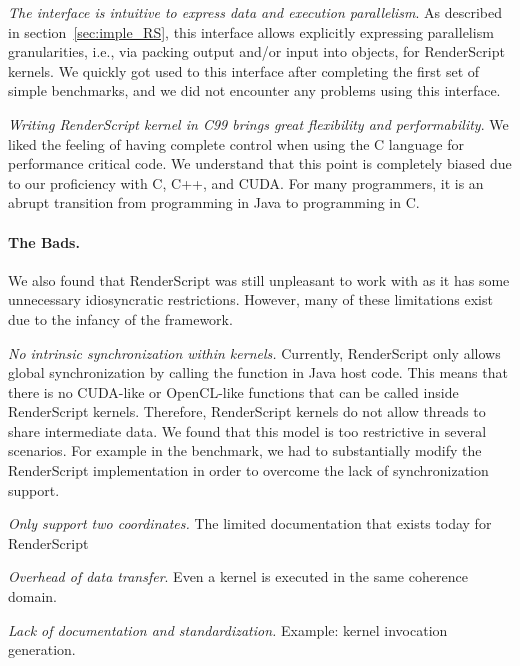\textit{The  interface is intuitive to express data and
execution parallelism}. As described in section~\ref{sec:imple_RS}, this
 interface allows explicitly expressing parallelism
granularities, i.e., via packing output and/or input into  objects,
for RenderScript kernels.  We quickly got used to this interface
after completing the first set of simple benchmarks, and we did not encounter
any problems using this interface.

\textit{Writing RenderScript kernel in C99 brings great flexibility and
performability}. We
liked the feeling of having complete control when using
the C language for performance critical code. We understand that this point is
completely biased due to our proficiency with C, C++, and CUDA. For many
programmers, it is an abrupt transition from programming in Java to programming
in C.


\paragraph{The Bads.} We also found that RenderScript was still unpleasant to work with as it has some unnecessary idiosyncratic restrictions. However, many of these limitations exist due to the
infancy of the framework.

\textit{No intrinsic synchronization within kernels.} Currently, RenderScript
only allows global synchronization by calling the  function in
Java host code. This means that there is no CUDA-like  or
OpenCL-like  functions that can be called inside RenderScript
kernels. Therefore, RenderScript kernels do not allow threads to share
intermediate data. We found that this model is too restrictive in several
scenarios. For example in the  benchmark, we had to substantially
modify the RenderScript  implementation in order
to overcome the lack of
synchronization support.

\textit{Only support two coordinates.} The limited documentation that exists today for RenderScript

\textit{Overhead of data transfer}. Even a kernel is executed in the same
coherence domain.

\textit{Lack of documentation and standardization.} Example: kernel invocation generation.



